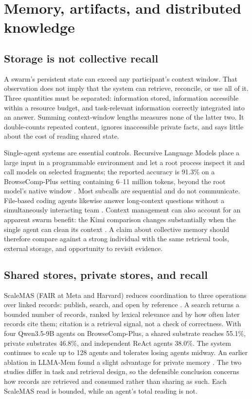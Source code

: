 \section{Memory, artifacts, and distributed knowledge}
\label{sec:memory}
\subsection{Storage is not collective recall}
A swarm's persistent state can exceed any participant's context window. That observation does not imply that the system can retrieve, reconcile, or use all of it. Three quantities must be separated: information stored, information accessible within a resource budget, and task-relevant information correctly integrated into an answer. Summing context-window lengths measures none of the latter two. It double-counts repeated content, ignores inaccessible private facts, and says little about the cost of reading shared state.

Single-agent systems are essential controls. Recursive Language Models place a large input in a programmable environment and let a root process inspect it and call models on selected fragments; the reported accuracy is 91.3\% on a BrowseComp-Plus setting containing 6--11 million tokens, beyond the root model's native window \citep{recursive-language-models}. Most subcalls are sequential and do not communicate. File-based coding agents likewise answer long-context questions without a simultaneously interacting team \citep{coding-agents-long-context}. Context management can also account for an apparent swarm benefit: the Kimi comparison changes substantially when the single agent can clean its context \citep{kimi-agent-swarm,context-language-models}. A claim about collective memory should therefore compare against a strong individual with the same retrieval tools, external storage, and opportunity to revisit evidence.

\subsection{Shared stores, private stores, and recall}
ScaleMAS (FAIR at Meta and Harvard) reduces coordination to three operations over linked records: publish, search, and open by reference \citep{scalemas-substrate}. A search returns a bounded number of records, ranked by lexical relevance and by how often later records cite them; citation is a retrieval signal, not a check of correctness. With four Qwen3.5-9B agents on BrowseComp-Plus, a shared substrate reaches 55.1\%, private substrates 46.8\%, and independent ReAct agents 38.0\%. The system continues to scale up to 128 agents and tolerates losing agents midway. An earlier ablation in LLMA-Mem found a slight advantage for private memory \citep{scaling-teams-or-time}. The two studies differ in task and retrieval design, so the defensible conclusion concerns how records are retrieved and consumed rather than sharing as such. Each ScaleMAS read is bounded, while an agent's total reading is not.

